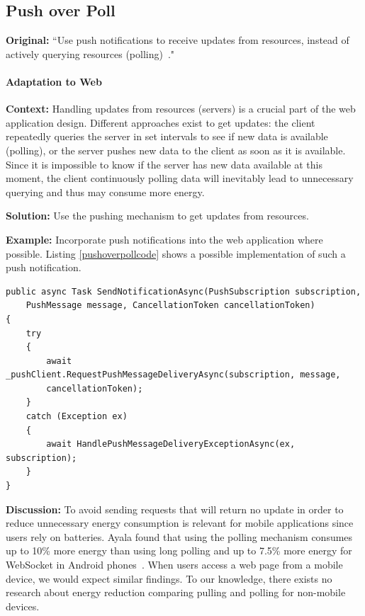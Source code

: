 \subsection{Push over Poll} \label{sec:patterns-PushOverPoll}
\textbf{Original:} ``Use push notifications to receive updates from resources, instead of actively querying resources (\ie polling)~\cite{cruz2019catalog}."

\paragraph{Adaptation to Web}\mbox{}

\textbf{Context:} Handling updates from resources (\eg servers) is a crucial part of the web application design. Different approaches exist to get updates: the client repeatedly queries the server in set intervals to see if new data is available (\ie polling), or the server pushes new data to the client as soon as it is available. Since it is impossible to know if the server has new data available at this moment, the client continuously polling data will inevitably lead to unnecessary querying and thus may consume more energy.

\textbf{Solution:} Use the pushing mechanism to get updates from resources.

\textbf{Example:} Incorporate push notifications into the web application where possible. Listing \ref{pushoverpollcode} shows a possible implementation of such a push notification.

\begin{minipage}{0.95\linewidth}
    \begin{lstlisting}[caption={Code snippet of a push notification implementation.}, label={pushoverpollcode}]
public async Task SendNotificationAsync(PushSubscription subscription, 
    PushMessage message, CancellationToken cancellationToken)
{
    try
    {
        await _pushClient.RequestPushMessageDeliveryAsync(subscription, message, 
        cancellationToken);
    }
    catch (Exception ex)
    {
        await HandlePushMessageDeliveryExceptionAsync(ex, subscription);
    }
}
    \end{lstlisting}
\end{minipage}

\textbf{Discussion:} To avoid sending requests that will return no update in order to reduce unnecessary energy consumption is relevant for mobile applications since users rely on batteries. Ayala \etal found that using the polling mechanism consumes up to 10\% more energy than using long polling and up to 7.5\%  more energy for WebSocket in Android phones~\cite{Ayala2019}. When users access a web page from a mobile device, we would expect similar findings. To our knowledge, there exists no research about energy reduction comparing pulling and polling for non-mobile devices.

